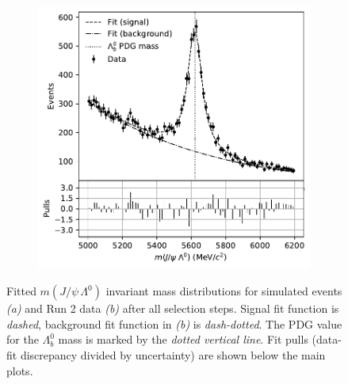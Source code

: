 \begin{figure}[t]
\begin{subfigure}{.45\textwidth}
		\includegraphics[width=\textwidth]{graphics/04-event_selection/data_lambdab_hard_fit.pdf}
		\caption{}
		\label{fig:4:data_fit}
	\end{subfigure}
	\caption{Fitted $m(J/\psi\,\Lambda^0)$ invariant mass distributions for simulated \demonstratorshort events \textit{(a)} and Run 2 data \textit{(b)} after all selection steps. Signal fit function is \textit{dashed}, background fit function in \textit{(b)} is \textit{dash-dotted}. The PDG value for the $\Lambda_b^0$ mass \cite{PDG} is marked by the \textit{dotted vertical line}. Fit pulls (data-fit discrepancy divided by uncertainty) are shown below the main plots.}
\end{figure}

